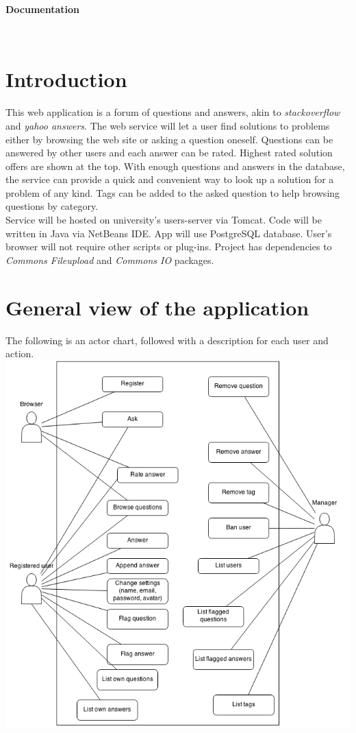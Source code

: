 \documentclass[a4paper,12pt]{article}
\begin{document}
\vspace*{\fill}
\centerline{\huge \textbf{Documentation}} \hspace*{\fill}
\vspace*{\fill}
\\
\tableofcontents
\newpage

\section{Introduction}
This web application is a forum of questions and answers, akin to \emph{stackoverflow} and \emph{yahoo answers}. The web service will let a user find solutions to problems either by browsing the web site or asking a question oneself. Questions can be answered by other users and each answer can be rated. Highest rated solution offers are shown at the top. With enough questions and answers in the database, the service can provide a quick and convenient way to look up a solution for a problem of any kind. Tags can be added to the asked question to help browsing questions by category.\\
\indent Service will be hosted on university's users-server via Tomcat. Code will be written in Java via NetBeans IDE. App will use PostgreSQL database. User's browser will not require other scripts or plug-ins. Project has dependencies to \emph{Commons Fileupload} and \emph{Commons IO} packages.
\newpage

\section{General view of the application}
The following is an actor chart, followed with a description for each user and action.\\
\includegraphics[scale=0.6]{ActorChart}
\end{document}
